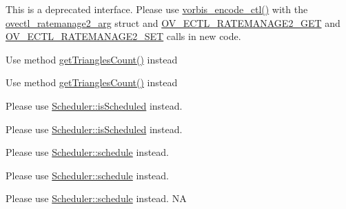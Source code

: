 \begin{DoxyRefList}
This is a deprecated interface. Please use \hyperlink{cocos2d_2external_2win10-specific_2OggDecoder_2include_2vorbis_2vorbisenc_8h_a5f398a378e20b8ce5e3341a582e773bd}{vorbis\+\_\+encode\+\_\+ctl()} with the \hyperlink{structovectl__ratemanage2__arg}{ovectl\+\_\+ratemanage2\+\_\+arg} struct and \hyperlink{_2cocos2d_2external_2win32-specific_2OggDecoder_2include_2vorbis_2vorbisenc_8h_af95048070bedb467f80ce85e20057126}{O\+V\+\_\+\+E\+C\+T\+L\+\_\+\+R\+A\+T\+E\+M\+A\+N\+A\+G\+E2\+\_\+\+G\+ET} and \hyperlink{_2cocos2d_2external_2win32-specific_2OggDecoder_2include_2vorbis_2vorbisenc_8h_a5075e0acb85fd45398a290594f83d6ba}{O\+V\+\_\+\+E\+C\+T\+L\+\_\+\+R\+A\+T\+E\+M\+A\+N\+A\+G\+E2\+\_\+\+S\+ET} calls in new code. 
\item[\label{deprecated__deprecated000253}%
\Hypertarget{deprecated__deprecated000253}%
Member \hyperlink{classPolygonInfo_ga29950bcfeaeaa13bca256166562caabc}{Polygon\+Info\+:\+:get\+Triagles\+Count} () const]Use method \hyperlink{group____2d_ga0ca8e8c33d34a16c1f8cf33d13aeea2b}{get\+Triangles\+Count()} instead 

Use method \hyperlink{group____2d_ga0ca8e8c33d34a16c1f8cf33d13aeea2b}{get\+Triangles\+Count()} instead  
\item[\label{deprecated__deprecated000058}%
\Hypertarget{deprecated__deprecated000058}%
Member \hyperlink{classScheduler_a9cdd2ece7f43eaca5662d12ae0b95a87}{Scheduler\+:\+:is\+Scheduled\+For\+Target} (\hyperlink{classRef}{Ref} $\ast$target, S\+E\+L\+\_\+\+S\+C\+H\+E\+D\+U\+LE selector)]Please use \textquotesingle{}\hyperlink{classScheduler_a5b534eae62394806603e522ab4191d3b}{Scheduler\+::is\+Scheduled}\textquotesingle{} instead. 

Please use \textquotesingle{}\hyperlink{classScheduler_a5b534eae62394806603e522ab4191d3b}{Scheduler\+::is\+Scheduled}\textquotesingle{} instead.  
\item[\label{deprecated__deprecated000054}%
\Hypertarget{deprecated__deprecated000054}%
Member \hyperlink{classScheduler_ae8df7fdf2f74a90cdb37bc334a550360}{Scheduler\+:\+:schedule\+Selector} (S\+E\+L\+\_\+\+S\+C\+H\+E\+D\+U\+LE selector, \hyperlink{classRef}{Ref} $\ast$target, float interval, unsigned int repeat, float delay, bool paused)]Please use {\ttfamily \hyperlink{classScheduler_a0d52145629a67e888cf1b25fd01f668b}{Scheduler\+::schedule}} instead. 

Please use {\ttfamily \hyperlink{classScheduler_a0d52145629a67e888cf1b25fd01f668b}{Scheduler\+::schedule}} instead.  
\item[\label{deprecated__deprecated000055}%
\Hypertarget{deprecated__deprecated000055}%
Member \hyperlink{classScheduler_ab41f346fb140ff11ebc2b0736bc7b58a}{Scheduler\+:\+:schedule\+Selector} (S\+E\+L\+\_\+\+S\+C\+H\+E\+D\+U\+LE selector, \hyperlink{classRef}{Ref} $\ast$target, float interval, bool paused)]Please use {\ttfamily \hyperlink{classScheduler_a0d52145629a67e888cf1b25fd01f668b}{Scheduler\+::schedule}} instead.  NA 


\end{DoxyRefList}
